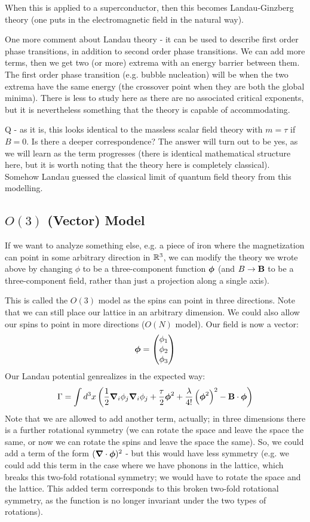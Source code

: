When this is applied to a superconductor, then this becomes Landau-Ginzberg theory (one puts in the electromagnetic field in the natural way).

One more comment about Landau theory - it can be used to describe first order phase transitions, in addition to second order phase transitions. We can add more terms, then we get two (or more) extrema with an energy barrier between them. The first order phase transition (e.g. bubble nucleation) will be when the two extrema have the same energy (the crossover point when they are both the global minima). There is less to study here as there are no associated critical exponents, but it is nevertheless something that the theory is capable of accommodating. 

Q - as it is, this looks identical to the massless scalar field theory with $m = \tau$ if $B = 0$. Is there a deeper correspondence? The answer will turn out to be yes, as we will learn as the term progresses (there is identical mathematical structure here, but it is worth noting that the theory here is completely classical). Somehow Landau guessed the classical limit of quantum field theory from this modelling.

\subsection{$O(3)$ (Vector) Model}
If we want to analyze something else, e.g. a piece of iron where the magnetization can point in some arbitrary direction in $\mathbb{R}^3$, we can modify the theory we wrote above by changing $\phi$ to be a three-component function $\gv{\phi}$ (and $B \to \mathbf{B}$ to be a three-component field, rather than just a projection along a single axis). 

This is called the $O(3)$ model as the spins can point in three directions. Note that we can still place our lattice in an arbitrary dimension. We could also allow our spins to point in more directions ($O(N)$ model). Our field is now a vector:
\begin{equation}
    \gv{\phi} = \m{\phi_1 \\ \phi_2 \\ \phi_3}
\end{equation}
Our Landau potential genrealizes in the expected way:
\begin{equation}
    \Gamma = \int d^3x \left(\frac{1}{2}\nabla_i \phi_j\nabla_i \phi_j + \frac{\tau}{2}\gv{\phi}^2 + \frac{\lambda}{4!}\left(\gv{\phi}^2\right)^2 - \v{B} \cdot \gv{\phi}\right)
\end{equation}
Note that we are allowed to add another term, actually; in three dimensions there is a further rotational symmetry (we can rotate the space and leave the space the same, or now we can rotate the spins and leave the space the same). So, we could add a term of the form $(\nabla \cdot \gv{\phi})^2$ - but this would have less symmetry (e.g. we could add this term in the case where we have phonons in the lattice, which breaks this two-fold rotational symmetry; we would have to rotate the space and the lattice. This added term corresponds to this broken two-fold rotational symmetry, as the function is no longer invariant under the two types of rotations).

